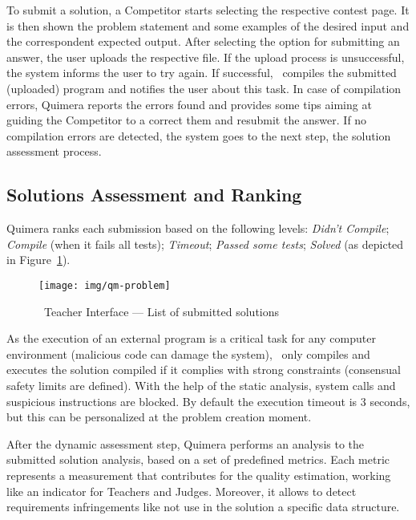 To submit a solution,
a \textsf{Competitor} starts  selecting the respective contest page.
It is then shown the problem statement and some examples of the desired input and the correspondent expected output. %
After selecting the option for submitting an answer, the user uploads the respective file.
If the upload process is unsuccessful, the system informs the user to try again.
If successful, \quim\ compiles the submitted (uploaded) program and notifies the user about this task.
In case of compilation errors, Quimera reports the errors found and provides some tips aiming at guiding the Competitor to a correct them and resubmit the answer. 
If no compilation errors are detected, the system goes to the next step, the solution assessment process.


\subsection{Solutions Assessment and Ranking}

Quimera ranks each submission based on the following levels: \emph{Didn't Compile}; \emph{Compile} (when it fails all tests); \emph{Timeout}; \emph{Passed some tests}; \emph{Solved} (as depicted in Figure~\ref{fig:problem}).

\begin{figure}[h]
\begin{center}
\texttt{[image: img/qm-problem]}
\caption{ \quim\ \textsf{Teacher} Interface --- List of submitted solutions}\label{fig:problem}
\end{center}
\end{figure}


As the execution of an external program is a critical task for any computer environment
(malicious  code can  damage the system),
\quim\ only compiles and executes the solution compiled if it complies with strong constraints
(consensual safety limits are defined).
With the help of the static analysis, system calls and suspicious instructions are blocked.
By default the execution timeout is 3 seconds, but this can be personalized at the problem creation moment.

After the dynamic assessment step, Quimera performs an analysis to the submitted solution analysis, based on a set of predefined metrics.
Each metric represents a measurement that contributes for the quality estimation, working like an indicator for \textsf{Teachers} and \textsf{Judges}.
Moreover, it allows to detect requirements infringements like not use in the solution a specific data structure. 

